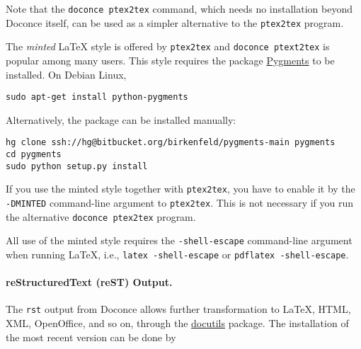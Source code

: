 \documentclass[%
oneside,                 %
final,                   %
10pt]{article}
\begin{document}
Note that the {\fontsize{10pt}{10pt}\Verb!doconce ptex2tex!} command, which needs no installation
beyond Doconce itself, can be used as a simpler alternative to the {\fontsize{10pt}{10pt}\Verb!ptex2tex!}
program.

The \emph{minted} {\LaTeX} style is offered by {\fontsize{10pt}{10pt}\Verb!ptex2tex!} and {\fontsize{10pt}{10pt}\Verb!doconce ptext2tex!}
is popular among many
users. This style requires the package \href{{http://pygments.org}}{Pygments}
to be installed. On Debian Linux,
\vspace{4pt}
\begin{Verbatim}[numbers=none,frame=lines,label=\fbox{{\tiny Terminal}},fontsize=\fontsize{9pt}{9pt},
labelposition=topline,framesep=2.5mm,framerule=0.7pt]
sudo apt-get install python-pygments
\end{Verbatim}
Alternatively, the package can be installed manually:
\vspace{4pt}
\begin{Verbatim}[numbers=none,frame=lines,label=\fbox{{\tiny Terminal}},fontsize=\fontsize{9pt}{9pt},
labelposition=topline,framesep=2.5mm,framerule=0.7pt]
hg clone ssh://hg@bitbucket.org/birkenfeld/pygments-main pygments
cd pygments
sudo python setup.py install
\end{Verbatim}

If you use the minted style together with {\fontsize{10pt}{10pt}\Verb!ptex2tex!}, you have to
enable it by the {\fontsize{10pt}{10pt}\Verb!-DMINTED!} command-line argument to {\fontsize{10pt}{10pt}\Verb!ptex2tex!}.
This is not necessary if you run the alternative {\fontsize{10pt}{10pt}\Verb!doconce ptex2tex!} program.

All
use of the minted style requires the {\fontsize{10pt}{10pt}\Verb!-shell-escape!} command-line
argument when running {\LaTeX}, i.e., {\fontsize{10pt}{10pt}\Verb!latex -shell-escape!} or {\fontsize{10pt}{10pt}\Verb!pdflatex -shell-escape!}.


\paragraph{reStructuredText (reST) Output.}
The {\fontsize{10pt}{10pt}\Verb!rst!} output from Doconce allows further transformation to {\LaTeX},
HTML, XML, OpenOffice, and so on, through the \href{{http://docutils.sourceforge.net}}{docutils} package.  The installation of the
most recent version can be done by
\end{document}

